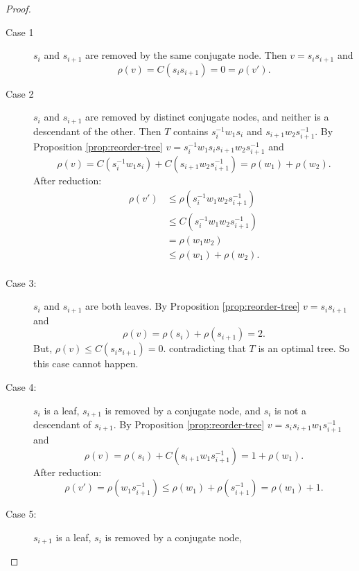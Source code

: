 \documentclass[12pt]{thesis}
\begin{document}
\begin{proof}
\begin{description}
    \item [Case 1]
          $s_{i}$ and $s_{i+1}$ are removed by the same conjugate node.
          Then $v = s_{i}s_{i+1}$ and
          \[
            \rho(v) = C(s_{i}s_{i+1}) = 0 = \rho(v').
          \]
 \item [Case 2]
        $s_{i}$ and $s_{i+1}$ are removed by distinct conjugate nodes,
        and neither is a descendant of the other.
        Then $T$ contains $s_{i}^{-1} w_{1} s_{i}$ and $s_{i +1} w_{2} s_{i + 1}^{-1}$.
        By Proposition \ref{prop:reorder-tree}
        $v = s_{i}^{-1} w_{1} s_{i}  s_{i +1} w_{2} s_{i + 1}^{-1}$
        and
        \[
                \rho(v) 
                = C(s_{i}^{-1} w_{1} s_{i}) + C(s_{i +1} w_{2} s_{i + 1}^{-1}) 
                = \rho(w_{1}) + \rho(w_{2}).
        \]
        After reduction:
        \[
            \begin{split}
            \rho(v') &\leq \rho(s_{i}^{-1} w_{1}w_{2} s_{i+1}^{-1})   \\
            &\leq C(s_{i}^{-1} w_{1}w_{2} s_{i+1}^{-1})  \\
            &= \rho(w_{1}w_{2})\\
            &\leq \rho(w_{1}) + \rho(w_{2}). \\
           \end{split}
        \]
   \item[Case 3:]
        $s_{i}$ and $s_{i + 1}$ are both leaves. 
        By Proposition \ref{prop:reorder-tree}
         $v = s_{i}s_{i+1}$
         and 
         \[
             \rho(v) = \rho(s_{i}) + \rho(s_{i+1}) = 2.
         \]
        But, $\rho(v) \leq C(s_{i}s_{i+1}) = 0$.
        contradicting that $T$ is an optimal tree.
        So this case cannot happen.
    \item [Case 4:]
          $s_{i}$ is a leaf, $s_{i + 1}$ is removed by a conjugate node,
          and $s_{i}$ is not a descendant of $s_{i + 1}$.
            By Proposition \ref{prop:reorder-tree}
            $v = s_{i} s_{i+1} w_{1} s_{i+1}^{-1}$
            and
            \[
               \rho(v) = \rho(s_{i}) + C(s_{i+1} w_{1} s_{i+1}^{-1})
               = 1 + \rho(w_{1}).
           \]
           After reduction: 
             \[
                 \rho(v') = \rho(w_{1} s_{i+1}^{-1})
              \leq \rho(w_{1}) + \rho(s_{i+1}^{-1})
              = \rho(w_{1}) + 1.
           \]
     \item[Case 5:]
          $s_{i+1}$ is a leaf, $s_{i}$ is removed by a conjugate node,

\end{description}
\end{proof}
\end{document}
